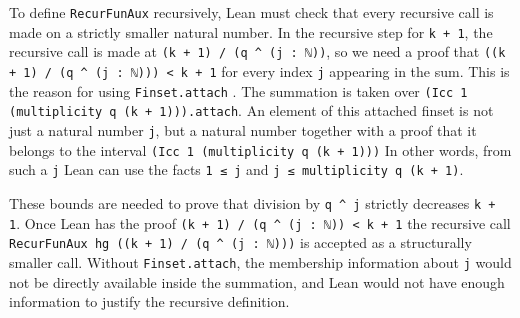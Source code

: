 

To define \lstinline|RecurFunAux| recursively, Lean must check that every
recursive call is made on a strictly smaller natural number.  In the
recursive step for \lstinline|k + 1|, the recursive call is made at
\lstinline|(k + 1) / (q ^ (j : ℕ))|, so we need a proof that
\lstinline|((k + 1) / (q ^ (j : ℕ))) < k + 1| for every index \lstinline|j|
appearing in the sum.
This is the reason for using \lstinline|Finset.attach|
\href{https://leanprover-community.github.io/mathlib4_docs/Mathlib/Data/Finset/Attach.html#Finset.attach}{\faExternalLink}
.
The summation is
taken over \lstinline|(Icc 1 (multiplicity q (k + 1))).attach|.
An element of this attached finset is not just a natural number
\lstinline|j|, but a natural number together with a proof that it belongs
to the interval \lstinline|(Icc 1 (multiplicity q (k + 1)))|
In other words, from such a \lstinline|j| Lean can use the facts
\lstinline|1 ≤ j| and \lstinline|j ≤ multiplicity q (k + 1)|.

These bounds are needed to prove that division by \lstinline|q ^ j|
strictly decreases \lstinline|k + 1|.  Once Lean has the proof
\lstinline|(k + 1) / (q ^ (j : ℕ)) < k + 1|
the recursive call
\lstinline|RecurFunAux hg ((k + 1) / (q ^ (j : ℕ)))|
is accepted as a structurally smaller call.  Without
\lstinline|Finset.attach|, the membership information about \lstinline|j|
would not be directly available inside the summation, and Lean would not
have enough information to justify the recursive definition.

